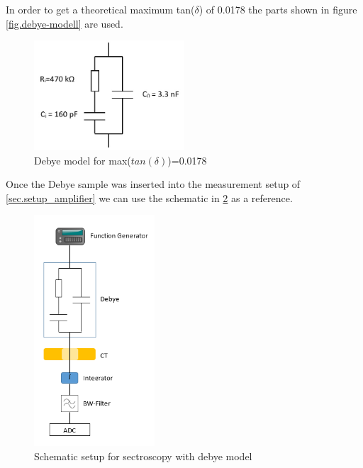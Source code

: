 In order to get a theoretical maximum tan($\delta$) of 0.0178 the parts shown in figure \ref{fig.debye-modell} are used. 
\begin{figure}[h!tb]
	\centerline{\includegraphics[width=0.5\textwidth]{figures/Method/debye-modell.jpg}}	
	\caption{Debye model for max($tan(\delta)$)=0.0178 }	
	\label{fig.debye-modellsch}
\end{figure}

Once the Debye sample  was inserted into the measurement setup of \ref{sec.setup_amplifier} we can use the schematic in \ref{fig.presentation} as a reference.

\begin{figure}[h!tb]
	\centerline{\includegraphics[width=0.4\textwidth]{figures/Method/setup/low_voltage_setup.png}}	
	\caption{Schematic setup for sectroscopy with debye model}	
	\label{fig.presentation}
\end{figure}

